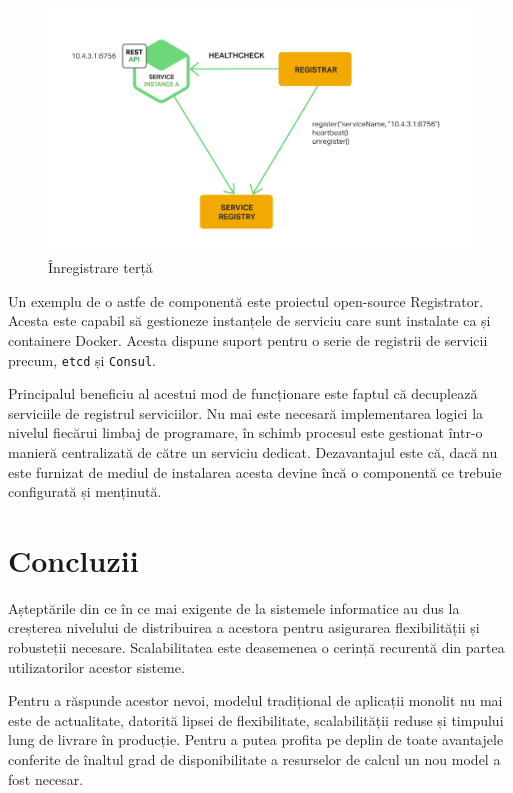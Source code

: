 \documentclass[12pt, a4paper, oneside, romanian]{teza-upb}
\begin{document}
\begin{figure}[ht]
\centering
\includegraphics[scale=0.4]{img/Richardson-microservices-part4-5_third-party-pattern.png}
\caption{Înregistrare terță}
\label{fig:arhi_componente}
\end{figure}

Un exemplu de o astfe de componentă este proiectul open-source Registrator. Acesta este capabil să gestioneze instanțele de serviciu care sunt instalate ca și containere Docker. Acesta dispune suport pentru o serie de registrii de servicii precum, \texttt{etcd} și \texttt{Consul}.

Principalul beneficiu al acestui mod de funcționare este faptul că decuplează serviciile de registrul serviciilor. Nu mai este necesară implementarea logici la nivelul fiecărui limbaj de programare, în schimb procesul este gestionat într-o manieră centralizată de către un serviciu dedicat. Dezavantajul este că, dacă nu este furnizat de mediul de instalarea acesta devine încă o componentă ce trebuie configurată și menținută. 

\chapter{Concluzii}

Așteptările din ce în ce mai exigente de la sistemele informatice au dus la creșterea nivelului de distribuirea a acestora pentru asigurarea flexibilității și robusteții necesare. Scalabilitatea este deasemenea o cerință recurentă din partea utilizatorilor acestor sisteme.

Pentru a răspunde acestor nevoi, modelul tradițional de aplicații monolit nu mai este de actualitate, datorită lipsei de flexibilitate, scalabilității reduse și timpului lung de livrare în producție. Pentru a putea profita pe deplin de toate avantajele conferite de înaltul grad de disponibilitate a resurselor de calcul un nou model a fost necesar. 
\end{document}
